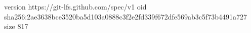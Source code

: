 version https://git-lfs.github.com/spec/v1
oid sha256:2ae3638bce3520ba5d103a0888c3f2e2fd339f672dfe569ab3c5f73b4491a727
size 817
